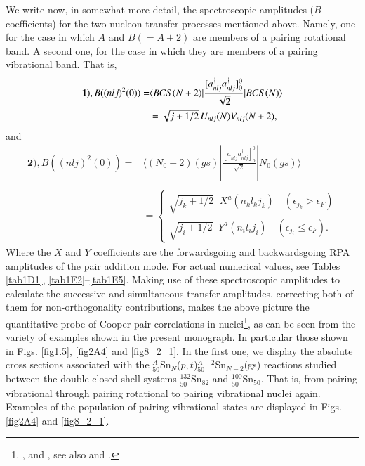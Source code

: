 We write now, in somewhat more detail, the spectroscopic amplitudes ($B$-coefficients) for the two-nucleon transfer processes mentioned above. Namely, one for the case in which $A$ and $B(=A+2)$ are members of a pairing rotational band. A second one, for the case in which they are members of a pairing vibrational band. That is, 
\begin{equation}\label{eqC21.8}
\begin{split}
\mathbf{1)}, B((nlj)^2(0))=&\langle BCS(N+2)|\frac{[a^\dagger_{nlj}a^\dagger_{nlj}]^0_0}{\sqrt{2}}|BCS(N)\rangle\\
&=\sqrt{j+1/2}\,U_{nlj}(N)V_{nlj}(N+2), 
\end{split}\idx{Pairing rotational bands!two-nucleon transfer spectroscopic amplitudes}
\end{equation}
and
\begin{equation}\label{eqC21.9}
\begin{split}
\mathbf{2)}, B((nlj)^2(0))=&\langle (N_0+2)(gs)|\frac{[a^\dagger_{nlj}a^\dagger_{nlj}]^0_0}{\sqrt{2}}|N_0(gs)\rangle \\
&\\
&=\left\{\begin{array}{c}
\sqrt{j_k+1/2}\;\;X^a(n_kl_kj_k)\quad (\epsilon_{j_k}>\epsilon_F) \\ 
\sqrt{j_i+1/2}\;\;Y^a(n_il_ij_i)\quad (\epsilon_{j_i}\leq\epsilon_F).
\end{array} \right.
\end{split}
\end{equation}
Where the $X$ and $Y$ coefficients are the forwardsgoing and backwardsgoing RPA amplitudes of the pair addition mode.
For actual numerical values, see Tables \ref{tab1D1},   \ref{tab1E2}--\ref{tab1E5}. Making use of these spectroscopic amplitudes to calculate the successive and simultaneous transfer amplitudes, correcting both of them for non-orthogonality contributions, makes the above picture the quantitative probe of Cooper pair correlations in nuclei\footnote{\label{f29C3} \cite{Bayman:82}, \cite{Thompson:88,Thompson:09,Broglia:04a} and \cite{Potel:13}, see also \cite{Gotz:75} and \cite{Broglia:77b}.}, as can be seen  from the variety of examples shown in the present monograph. In particular those shown in  Figs. \ref{fig1.5},  \ref{fig2A4} and \ref{fig8_2_1}. In the first one, we display the absolute cross sections associated with the $^{A}_{50}$Sn$_{N}$($p,t$)$^{A-2}_{50}$Sn$_{N-2}$(gs) reactions studied between the double closed shell systems $^{132}_{50}$Sn$_{82}$ and $^{100}_{50}$Sn$_{50}$. That is, from pairing vibrational through pairing rotational to pairing vibrational nuclei again.  Examples of the population of  pairing vibrational states are displayed in Figs. \ref{fig2A4} and \ref{fig8_2_1}.

